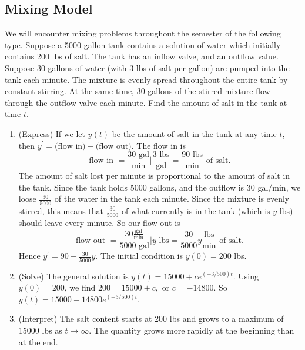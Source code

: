 \subsection{Mixing Model}
We will encounter mixing problems throughout the semester of the following type.  Suppose a 5000 gallon tank contains a solution of water which initially contains 200 lbs of salt. The tank has an inflow valve, and an outflow value.  Suppose 30 gallons of water (with 3 lbs of salt per gallon) are pumped into the tank each minute. The mixture is evenly spread throughout the entire tank by constant stirring.  At the same time, 30 gallons of the stirred mixture flow through the outflow valve each minute.  Find the amount of salt in the tank at time $t$.


\begin{enumerate}
	\item (Express) If we let $y(t)$ be the amount of salt in the tank at any time $t$, then $y^\prime=\text{(flow in)}-\text{(flow out)}$. The flow in is 
	$$\text{flow in }=\frac{30 \text{ gal}}{\text{min}}\bigg|\frac{3 \text{ lbs}}{\text{gal}} = \frac{90 \text{ lbs}}{\text{min}} \text{ of salt.}$$ 
The amount of salt lost per minute is proportional to the amount of salt in the tank. Since the tank holds 5000 gallons, and the outflow is 30 gal/min, we loose $\frac{30}{5000}$ of the water in the tank each minute.  Since the mixture is evenly stirred, this means that $\frac{30}{5000}$ of what currently is in the tank (which is $y$ lbs) should leave every minute.  So our flow out is\
	$$\text{flow out }=\frac{30 \frac{\text{gal}}{\text{min}}}{5000 \text{ gal}}\bigg|y \text{ lbs} = \frac{30}{5000}y \frac{\text{lbs}}{\text{min}} \text{ of salt.}$$ 
Hence $y^\prime = 90-\frac{30}{5000}y$. The initial condition is $y(0)=200$ lbs.
	\item (Solve) The general solution is $y(t) = 15000+c e^{(-3/500) t}$.  Using $y(0)=200$, we find $200=15000+c,$ or $c=-14800$.  So $y(t) = 15000-14800 e^{(-3/500) t}$.
	\item (Interpret) The salt content starts at 200 lbs and grows to a maximum of 15000 lbs as $t\to\infty$.  The quantity grows more rapidly at the beginning than at the end.
\end{enumerate}





